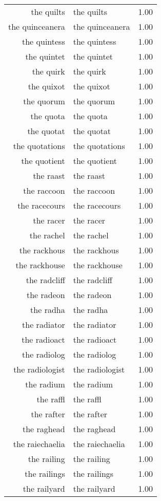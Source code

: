 \begin{table}[ht]
\begin{tabular}{rlr}
  the quilts & the quilts & 1.00 \\ 
  the quinceanera & the quinceanera & 1.00 \\ 
  the quintess & the quintess & 1.00 \\ 
  the quintet & the quintet & 1.00 \\ 
  the quirk & the quirk & 1.00 \\ 
  the quixot & the quixot & 1.00 \\ 
  the quorum & the quorum & 1.00 \\ 
  the quota & the quota & 1.00 \\ 
  the quotat & the quotat & 1.00 \\ 
  the quotations & the quotations & 1.00 \\ 
  the quotient & the quotient & 1.00 \\ 
  the raast & the raast & 1.00 \\ 
  the raccoon & the raccoon & 1.00 \\ 
  the racecours & the racecours & 1.00 \\ 
  the racer & the racer & 1.00 \\ 
  the rachel & the rachel & 1.00 \\ 
  the rackhous & the rackhous & 1.00 \\ 
  the rackhouse & the rackhouse & 1.00 \\ 
  the radcliff & the radcliff & 1.00 \\ 
  the radeon & the radeon & 1.00 \\ 
  the radha & the radha & 1.00 \\ 
  the radiator & the radiator & 1.00 \\ 
  the radioact & the radioact & 1.00 \\ 
  the radiolog & the radiolog & 1.00 \\ 
  the radiologist & the radiologist & 1.00 \\ 
  the radium & the radium & 1.00 \\ 
  the raffl & the raffl & 1.00 \\ 
  the rafter & the rafter & 1.00 \\ 
  the raghead & the raghead & 1.00 \\ 
  the raiechaelia & the raiechaelia & 1.00 \\ 
  the railing & the railing & 1.00 \\ 
  the railings & the railings & 1.00 \\ 
  the railyard & the railyard & 1.00 \\ 

\end{tabular}
\end{table}
